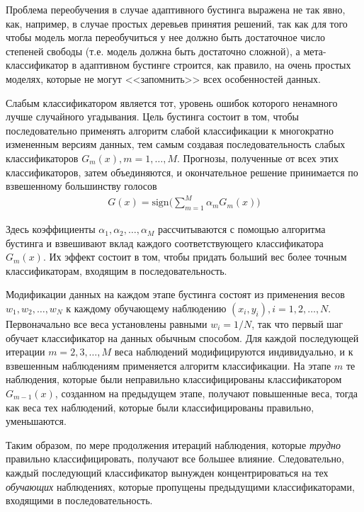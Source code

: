 \documentclass[%
	11pt,
	a4paper,
	utf8,
		]{article}
\begin{document}
Проблема переобучения в случае адаптивного бустинга выражена не так явно, как, например, в случае простых деревьев принятия решений, так как для того чтобы модель могла переобучиться у нее должно быть достаточное число степеней свободы (т.е. модель должна быть достаточно сложной), а мета-классификатор в адаптивном бустинге строится, как правило, на очень простых моделях, которые не могут <<запомнить>> всех особенностей данных.

Слабым классификатором является тот, уровень ошибок которого ненамного лучше случайного угадывания. Цель бустинга состоит в том, чтобы последовательно применять алгоритм слабой классификации к многократно измененным версиям данных, тем самым создавая последовательность слабых классификаторов $ G_m(x), m = 1, \ldots, M $. Прогнозы, полученные от всех этих классификаторов, затем объединяются, и окончательное решение принимается по взвешенному большинству голосов
\begin{align*}
	G(x) = \text{sign} \big( \sum_{m=1}^{M} \alpha_m G_m(x) \big)
\end{align*}

Здесь коэффициенты $ \alpha_1, \alpha_2, \ldots, \alpha_M $ рассчитываются с помощью алгоритма бустинга и взвешивают вклад каждого соответствующего классификатора $ G_m(x) $. Их эффект состоит в том, чтобы придать больший вес более точным классификаторам, входящим в последовательность.

Модификации данных на каждом этапе бустинга состоят из применения весов $ w_1, w_2, \ldots, w_N $ к каждому обучающему наблюдению $ (x_i, y_i), i = 1, 2, \ldots, N $. Первоначально все веса установлены равными $ w_i = 1/N $, так что первый шаг обучает классификатор на данных обычным способом. Для каждой последующей итерации $ m = 2, 3, \ldots, M $ веса наблюдений модифицируются индивидуально, и к взвешенным наблюдениям применяется алгоритм классификации. На этапе $ m $ те наблюдения, которые были неправильно классифицированы классификатором $ G_{m-1}(x) $, созданном на предыдущем этапе, получают повышенные веса, тогда как веса тех наблюдений, которые были классифицированы правильно, уменьшаются.

Таким образом, по мере продолжения итераций наблюдения, которые \emph{трудно} правильно классифицировать, получают все б\emph{о}льшее влияние. Следовательно, каждый последующий классификатор вынужден концентрироваться на тех \emph{обучающих} наблюдениях, которые пропущены предыдущими классификаторами, входящими в последовательность.
\end{document}
